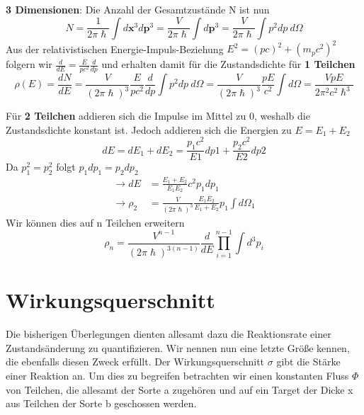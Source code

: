 \documentclass[Ex4_Zusammenfassung.tex]{subfiles}
\begin{document}
 \textbf{3 Dimensionen}: \newline
 Die Anzahl der Gesamtzustände N ist nun
 \begin{equation}
 N = \frac{1}{2 \pi \hslash} \int d\textbf{x}^3 d\textbf{p}^3 = \frac{V}{2 \pi \hslash} \int d\textbf{p}^3 = \frac{V}{2 \pi \hslash} \int p^2 dp \  d\Omega 
 \end{equation}
 Aus der relativistischen Energie-Impuls-Beziehung $ E^2 = (pc)^2 +  (m_pc^2)^2 $ folgern wir $ \frac{d}{dE} = \frac{E}{pc^2} \frac{d}{dp} $ und erhalten damit für die Zustandsdichte für \textbf{1 Teilchen}
 \begin{equation}
\rho(E) = \frac{dN}{dE} = \frac{V}{(2 \pi \hslash)^3}  \frac{E}{pc^2} \frac{d}{dp}  \int p^2 dp \  d\Omega =  \frac{V}{(2 \pi \hslash)^3} \frac{pE}{c^2} \int d\Omega = \frac{VpE}{2 \pi^2 c^2 \hslash^3}
\end{equation}

Für \textbf{2 Teilchen} addieren sich die Impulse im Mittel zu 0, weshalb die Zustandsdichte konstant ist. Jedoch addieren sich die Energien zu $ E = E_1 + E_2 $
\begin{equation}
dE = dE_1 + dE_2 = \frac{p_1c^2}{E1} dp1 + \frac{p_2c^2}{E2} dp2
\end{equation}
Da $ p_1^2 = p_2^2 $ folgt $  p_1 dp_{1} = p_2 dp_{2} $ 
\begin{align*}
\rightarrow  dE &= \frac{E_1 + E_2}{E_1E_2} c^2 p_1 dp_1  \\
\rightarrow  \rho_2 &=   \frac{V}{(2 \pi \hslash)^3} \frac{E_1E_2}{E_1+E_2} p_{1} \int d\Omega_{1}
\end{align*}
Wir können dies auf n Teilchen erweitern
\begin{equation}
\rho_{n} = \frac{V^{n-1}}{(2 \pi \hslash)^{3(n-1)}} \frac{d}{dE} \prod_{i=1}^{n-1} \int d^3p_{i} 
\end{equation}

\section{Wirkungsquerschnitt}
Die bisherigen Überlegungen dienten allesamt dazu die Reaktionsrate einer Zustandsänderung zu quantifizieren. Wir nennen nun eine letzte Größe kennen, die ebenfalls diesen Zweck erfüllt.
Der Wirkungsquerschnitt $ \sigma $ gibt die Stärke einer Reaktion an. Um dies zu begreifen betrachten wir einen konstanten Fluss  $\Phi $ von Teilchen, die allesamt der Sorte a zugehören und auf ein Target der Dicke x aus Teilchen der Sorte b geschossen werden.  
\end{document}

